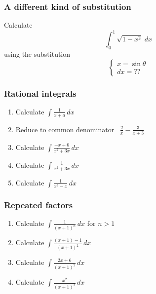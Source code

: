 \begin{frame}[t]
	\frametitle{A different kind of substitution}

	Calculate
	\[
		\int_{0}^{1}\sqrt{1 - x^{2}}\; dx
	\]
	using the substitution
	\[
		\begin{cases}
			x = \sin \theta \\
			dx = ??
		\end{cases}
	\]
\end{frame}

\begin{frame}[t]
	\fontsize{13}{13}\selectfont
	\frametitle{Rational integrals}

	\begin{enumerate}
		\item Calculate $\displaystyle \int \frac{1}{x+a}\, dx$
			\vspace{.2cm}

		\item Reduce to common denominator \, $\displaystyle \frac{2}{x}- \frac{3}{x+3}$
			\vspace{.2cm}

		\item Calculate $\displaystyle \int \frac{-x + 6}{x^{2}+ 3x}\, dx$
			\vspace{.2cm}

		\item Calculate $\displaystyle \int \frac{1}{x^{2}+ 3x}\, dx$
			\vspace{.2cm}

		\item Calculate $\displaystyle \int \frac{1}{x^{3}-x}\, dx$
	\end{enumerate}
\end{frame}

\begin{frame}[t]
	\fontsize{13}{13}\selectfont
	\frametitle{Repeated factors}

	\begin{enumerate}
		\item Calculate $\displaystyle \int \frac{1}{(x+1)^{n}}\, dx$ \quad for $n >1$
			\vspace{.2cm}

		\item Calculate $\displaystyle \int \frac{(x+1) - 1}{(x+1)^{2}}\, dx$
			\vspace{.2cm}

		\item Calculate $\displaystyle \int \frac{2x + 6}{(x+1)^{2}}\, dx$
			\vspace{.2cm}

		\item Calculate $\displaystyle \int \frac{x^{2}}{(x+1)^{3}}\, dx$
	\end{enumerate}
\end{frame}

